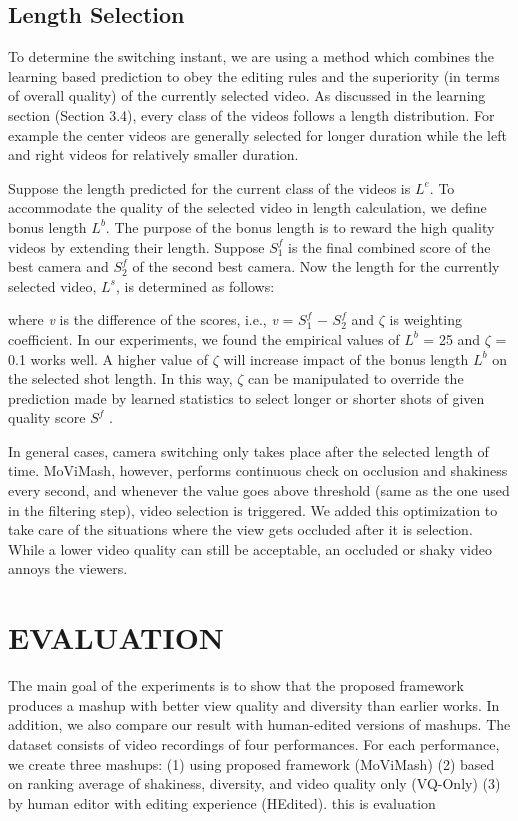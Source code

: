 \documentclass{sig-alternate}
\begin{document}
\subsection{Length Selection}

To determine the switching instant, we are using a method which combines the learning based prediction to obey the editing rules and the superiority (in terms of overall quality) of the currently selected video. As discussed in the learning section (Section 3.4), every class of the videos follows a length distribution. For example the center videos are generally selected for longer duration while the left and right videos for relatively smaller duration.

Suppose the length predicted for the current class of the videos is $L^e$. To accommodate the quality of the selected video in length calculation, we define bonus length $L^b$. The purpose of the bonus length is to reward the high quality videos by extending their length. Suppose $S_1^f$ is the final combined score of the best camera and $S_2^f$ of the second best camera. Now the length for the currently selected video, $L^s$, is determined as follows:

where \textit{v} is the difference of the scores, i.e., \textit{v} = $S_1^f$ − $S_2^f$ and  $\zeta $ is weighting coefficient. In our experiments, we found the empirical values of $L^b$ = 25 and $\zeta$ = 0.1 works well. A higher value of
$\zeta$ will increase impact of the bonus length $L^b$ on the selected shot
length. In this way, $\zeta$ can be manipulated to override the prediction
made by learned statistics to select longer or shorter shots of given
quality score $S^f$ .

In general cases, camera switching only takes place after the selected length of time. MoViMash, however, performs continuous check on occlusion and shakiness every second, and whenever the
value goes above threshold (same as the one used in the filtering
step), video selection is triggered. We added this optimization to
take care of the situations where the view gets occluded after it is
selection. While a lower video quality can still be acceptable, an
occluded or shaky video annoys the viewers.

\section{EVALUATION}
The main goal of the experiments is to show that the proposed framework produces a mashup with better view quality and diversity than earlier works. In addition, we also compare our result with human-edited versions of mashups. The dataset consists of video recordings of four performances. For each performance, we create three mashups: (1) using proposed framework (MoViMash) (2) based on ranking average of shakiness, diversity, and video quality only (VQ-Only) (3) by human editor with editing experience (HEdited). this is evaluation
\end{document}
